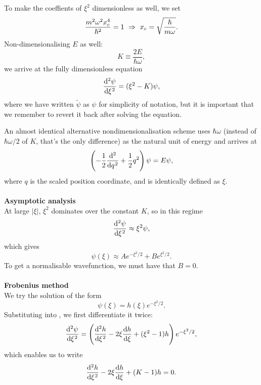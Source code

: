 To make the coeffients of $\xi^2$ dimensionless as well, we set 
\begin{equation}
\frac{m^2\omega^2x_c^4}{\hbar^2}=1\ \imp\ x_c=\sqrt{\frac{\hbar}{m\omega}}.
\end{equation}
Non-dimensionalising $E$ as well: 
\begin{equation}
K\equiv\frac{2E}{\hbar\omega}, 
\end{equation}
we arrive at the fully dimensionless equation 
\begin{equation}
\label{harm_diml}
\diff[2]{\psi}{\xi}=(\xi^2-K)\psi, 
\end{equation}
where we have written $\widetilde{\psi}$ as $\psi$ for simplicity of notation, but it is important that we remember to revert it back after solving the equation. \par
An almost identical alternative nondimensionalisation scheme uses $\hbar\omega$ (instead of $\hbar\omega/2$ of $K$, that's the only difference) as the natural unit of energy and arrives at 
\begin{equation}
\lf(-\frac{1}{2}\diff[2]{}{q}+\frac{1}{2}q^2\rt)\psi=E\psi,
\end{equation}
where $q$ is the scaled position coordinate, and is identically defined as $\xi$.
\\
\ \\
\textbf{Asymptotic analysis}\\
At large $|\xi|$, $\xi^2$ dominates over the constant $K$, so in this regime
\begin{equation}
\diff[2]{\psi}{\xi}\approx\xi^2\psi,
\end{equation}
which gives
\begin{equation}
\psi(\xi)\approx Ae^{-\xi^2/2}+Be^{\xi^2/2}.
\end{equation}
To get a normalisable wavefunction, we must have that $B=0$. \\
\ \\
\textbf{Frobenius method}\\
We try the solution of the form
\begin{equation}
\label{psi_frob}
\psi(\xi)=h(\xi)e^{-\xi^2/2}.
\end{equation}
Substituting  into , we first differentiate it twice:
\begin{equation}
\diff[2]{\psi}{\xi}=\lf(\diff[2]{h}{\xi}-2\xi\diff h\xi+(\xi^2-1)h \rt)e^{-\xi^2/2}, 
\end{equation}
which enables us to write 
\begin{equation}
\label{hermite_equation_k}
\diff[2]{h}{\xi}-2\xi\diff h\xi+(K-1)h=0.
\end{equation}
